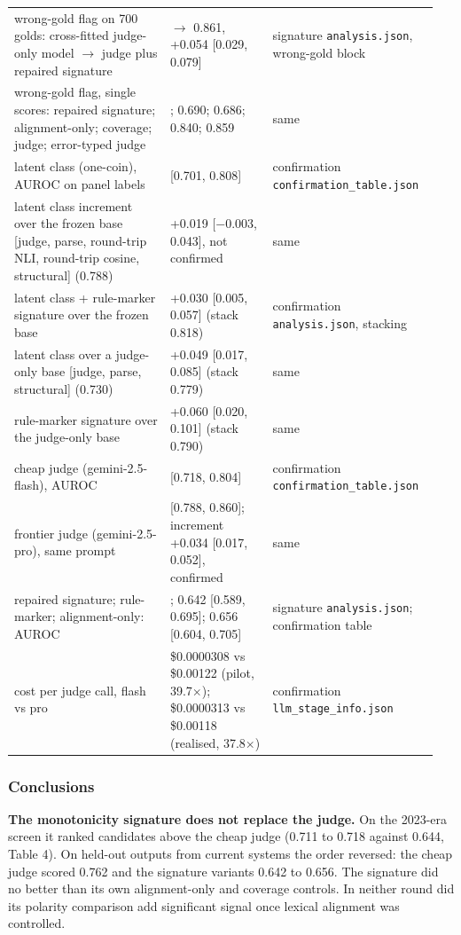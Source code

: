 \documentclass[11pt,letterpaper]{article}
\begin{document}
{\begin{longtable}{>{\raggedright\arraybackslash}p{0.350\linewidth}>{\raggedright\arraybackslash}p{0.234\linewidth}>{\raggedright\arraybackslash}p{0.368\linewidth}}
{}wrong-gold flag on 700 golds: cross-fitted judge-only model $\rightarrow$ judge plus repaired signature & 0.808 $\rightarrow$ 0.861, +0.054 [0.029, 0.079] & signature \texttt{analysis.json}, wrong-gold block \\
{}wrong-gold flag, single scores: repaired signature; alignment-only; coverage; judge; error-typed judge & 0.673; 0.690; 0.686; 0.840; 0.859 & same \\
{}latent class (one-coin), AUROC on panel labels & 0.756 [0.701, 0.808] & confirmation \texttt{confirmation\_\allowbreak{}\allowbreak{}table.json} \\
{}latent class increment over the frozen base [judge, parse, round-trip NLI, round-trip cosine, structural] (0.788) & +0.019 [$-$0.003, 0.043], not confirmed & same \\
{}latent class + rule-marker signature over the frozen base & +0.030 [0.005, 0.057] (stack 0.818) & confirmation \texttt{analysis.json}, stacking \\
{}latent class over a judge-only base [judge, parse, structural] (0.730) & +0.049 [0.017, 0.085] (stack 0.779) & same \\
{}rule-marker signature over the judge-only base & +0.060 [0.020, 0.101] (stack 0.790) & same \\
{}cheap judge (gemini-2.5-flash), AUROC & 0.762 [0.718, 0.804] & confirmation \texttt{confirmation\_\allowbreak{}\allowbreak{}table.json} \\
{}frontier judge (gemini-2.5-pro), same prompt & 0.825 [0.788, 0.860]; increment +0.034 [0.017, 0.052], confirmed & same \\
{}repaired signature; rule-marker; alignment-only: AUROC & 0.654; 0.642 [0.589, 0.695]; 0.656 [0.604, 0.705] & signature \texttt{analysis.json}; confirmation table \\
{}cost per judge call, flash vs pro & \$0.0000308 vs \$0.00122 (pilot, 39.7$\times$); \$0.0000313 vs \$0.00118 (realised, 37.8$\times$) & confirmation \texttt{llm\_\allowbreak{}\allowbreak{}stage\_\allowbreak{}\allowbreak{}info.json} \\
\end{longtable}
}

\subsubsection{Conclusions}

\textbf{The monotonicity signature does not replace the judge.} On the 2023-era screen it ranked candidates above the cheap judge (0.711 to 0.718 against 0.644, Table 4). On held-out outputs from current systems the order reversed: the cheap judge scored 0.762 and the signature variants 0.642 to 0.656. The signature did no better than its own alignment-only and coverage controls. In neither round did its polarity comparison add significant signal once lexical alignment was controlled.
\end{document}
